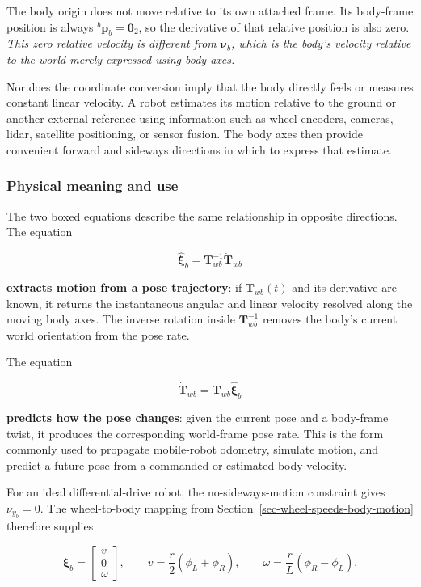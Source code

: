 \documentclass[
  australian,
  12pt,
  letterpaper,
  DIV=11,
  numbers=noendperiod,
  twoside]{scrreprt}
\begin{document}
The body origin does not move relative to its own attached frame. Its
body-frame position is always \({}^b\mathbf p_b=\mathbf 0_2\), so the
derivative of that relative position is also zero. \emph{This zero
relative velocity is different from \(\boldsymbol\nu_b\), which is the
body's velocity relative to the world merely expressed using body axes.}

Nor does the coordinate conversion imply that the body directly feels or
measures constant linear velocity. A robot estimates its motion relative
to the ground or another external reference using information such as
wheel encoders, cameras, lidar, satellite positioning, or sensor fusion.
The body axes then provide convenient forward and sideways directions in
which to express that estimate.

\subsubsection{Physical meaning and use}\label{physical-meaning-and-use}

The two boxed equations describe the same relationship in opposite
directions. The equation

\[
\widehat{\boldsymbol\xi}_b
=
\mathbf T_{wb}^{-1}\dot{\mathbf T}_{wb}
\]

\textbf{extracts motion from a pose trajectory}: if
\(\mathbf T_{wb}(t)\) and its derivative are known, it returns the
instantaneous angular and linear velocity resolved along the moving body
axes. The inverse rotation inside \(\mathbf T_{wb}^{-1}\) removes the
body's current world orientation from the pose rate.

The equation

\[
\dot{\mathbf T}_{wb}
=
\mathbf T_{wb}\widehat{\boldsymbol\xi}_b
\]

\textbf{predicts how the pose changes}: given the current pose and a
body-frame twist, it produces the corresponding world-frame pose rate.
This is the form commonly used to propagate mobile-robot odometry,
simulate motion, and predict a future pose from a commanded or estimated
body velocity.

For an ideal differential-drive robot, the no-sideways-motion constraint
gives \(\nu_{y_b}=0\). The wheel-to-body mapping from
Section~\ref{sec-wheel-speeds-body-motion} therefore supplies

\[
\boxed{
\boldsymbol\xi_b
=
\begin{bmatrix}
v\\
0\\
\omega
\end{bmatrix}
},
\qquad
v
=
\frac{r}{2}
\left(
\dot\phi_L+\dot\phi_R
\right),
\qquad
\omega
=
\frac{r}{L}
\left(
\dot\phi_R-\dot\phi_L
\right).
\]
\end{document}
